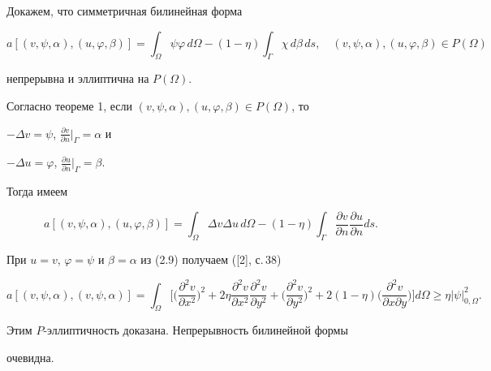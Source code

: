  


\begin{pf} 


Докажем, что симметричная билинейная форма 


$$ 


a[(v,\psi,\alpha),(u,\varphi,\beta)]=\int_\Omega 


\psi\varphi\,d\Omega-(1-\eta)\int_\Gamma\chi\,d\beta\,ds,\quad 


(v,\psi,\alpha),(u,\varphi,\beta)\in P(\Omega) 


$$ 


непрерывна и эллиптична на $P(\Omega)$. 


 


Согласно теореме 1, если $(v,\psi,\alpha),(u,\varphi,\beta)\in P(\Omega)$, то 


$-\Delta v=\psi$, $\frac{\partial v}{\partial n}\big|_\Gamma=\alpha$ и 


$-\Delta u=\varphi$, $\frac{\partial u}{\partial n}\big|_\Gamma=\beta$. 


Тогда имеем 


\begin{equation} 


a[(v,\psi,\alpha),(u,\varphi,\beta)]=\int_\Omega \Delta v 


\Delta u\,d\Omega-(1-\eta)\int_\Gamma 


\frac{\partial v}{\partial n}\frac{\partial u}{\partial n}ds. 


\end{equation} 


При $u=v$, $\varphi=\psi$ и $\beta=\alpha$ из (2.9) получаем ([2], с.\,38) 


$$


a[(v,\psi,\alpha),(v,\psi,\alpha)]=\int_\Omega\bigg[\bigg( 


\frac{\partial^2 v}{\partial x^2}\bigg)^2+2\eta 


\frac{\partial^2 v}{\partial x^2}\frac{\partial^2 v}{\partial y^2}+ 


\bigg(\frac{\partial^2 v}{\partial y^2} \bigg)^2+2(1-\eta) 


\bigg(\frac{\partial^2 v}{\partial x\partial y} \bigg)\bigg]d\Omega 


\ge \eta|\psi|^2_{0,\Omega}. 


$$


Этим $P$-эллиптичность доказана. Непрерывность билинейной формы 


очевидна. 


\end{pf} 


